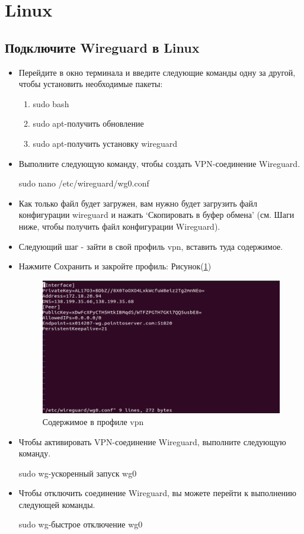 \section{Linux}

\subsection{Подключите Wireguard в Linux} 
\begin{itemize}
\item Перейдите в окно терминала и введите следующие команды одну за другой, чтобы установить необходимые пакеты:
\begin{enumerate}
\item sudo bash
\item sudo apt-получить обновление
\item sudo apt-получить установку wireguard
\end{enumerate}

\item Выполните следующую команду, чтобы создать VPN-соединение Wireguard.

sudo nano /etc/wireguard/wg0.conf
\item Как только файл будет загружен, вам нужно будет загрузить файл конфигурации wireguard и нажать ‘Скопировать в буфер обмена’ (см. Шаги ниже, чтобы получить файл конфигурации Wireguard).
\item Следующий шаг - зайти в свой профиль vpn, вставить туда содержимое.
\item Нажмите Сохранить и закройте профиль:  Рисунок(\ref{fig:18})
\begin{figure}[H]
\includegraphics[width=12cm]{13.png}
\centering
\caption{Содержимое в профиле vpn}
\label{fig:18}
\end{figure}
\item Чтобы активировать VPN-соединение Wireguard, выполните следующую команду.

sudo wg-ускоренный запуск wg0
\item Чтобы отключить соединение Wireguard, вы можете перейти к выполнению следующей команды.

sudo wg-быстрое отключение wg0
\end{itemize}

